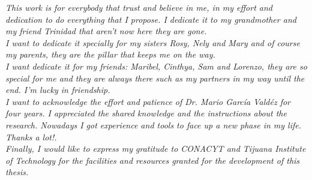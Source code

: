 


\textit{This work is for everybody that trust and believe in me,  in my effort and dedication to do everything that I propose. I dedicate it to my grandmother and my friend Trinidad that aren't now here they are gone.\\ 
I want to dedicate it specially for my sisters Rosy, Nely and Mary and of course my parents, they are the pillar that keeps me on the way. \\ 
I want dedicate it for my friends: Maribel, Cinthya, Sam and Lorenzo, they are so special for me and they are always there such as my partners in my way until the end. I'm lucky in friendship. \\
I want to acknowledge the effort and patience of Dr. Mario Garc\'ia Vald\'ez for four years. I appreciated the shared knowledge and the instructions about the research. Nowadays I got experience and tools to face up a new phase in my life. Thanks a lot!.\\ 
Finally, I would like to express my gratitude to CONACYT and Tijuana Institute of Technology for the facilities and resources granted for the development of this thesis.}

